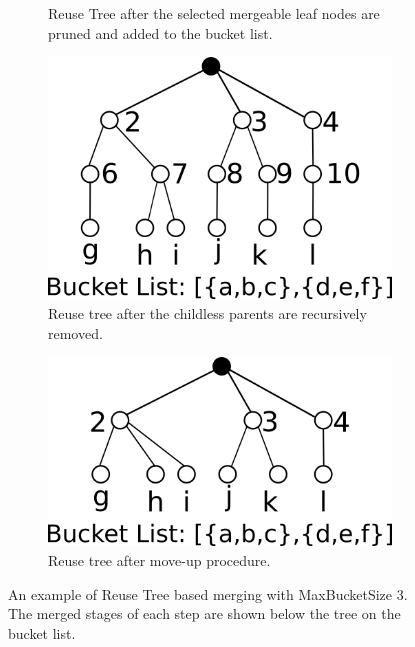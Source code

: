\begin{figure}[!h]
\begin{subfigure}[b]{0.45\textwidth}
				\caption{Reuse Tree after the selected mergeable leaf nodes are pruned and added to the bucket list.}
				\label{fig:rg2}
		\end{subfigure}
		\hspace{3mm}
		\begin{subfigure}[b]{0.45\textwidth}
				\includegraphics[width=\textwidth]{img/rg3.png}
				\caption{Reuse tree after the childless parents are recursively removed.}
				\label{fig:rg3}
		\end{subfigure}
		\par\bigskip
		\begin{subfigure}[b]{0.45\textwidth}
				\includegraphics[width=\textwidth]{img/rg4.png}
				\caption{Reuse tree after move-up procedure.}
				\label{fig:rg4}
		\end{subfigure}
		\caption{An example of Reuse Tree based merging with MaxBucketSize 3. The merged stages of each step are shown below the tree on the bucket list.}
		\label{fig:rt-example}
\end{figure}

